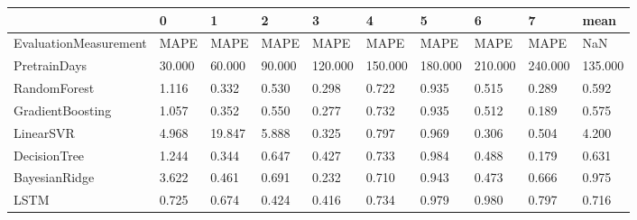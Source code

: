 \begin{tabular}{llllllllll}
\toprule
{} &      0 &      1 &      2 &       3 &       4 &       5 &       6 &       7 &    mean \\
\midrule
EvaluationMeasurement &   MAPE &   MAPE &   MAPE &    MAPE &    MAPE &    MAPE &    MAPE &    MAPE &     NaN \\
PretrainDays          & 30.000 & 60.000 & 90.000 & 120.000 & 150.000 & 180.000 & 210.000 & 240.000 & 135.000 \\
RandomForest          &  1.116 &  0.332 &  0.530 &   0.298 &   0.722 &   0.935 &   0.515 &   0.289 &   0.592 \\
GradientBoosting      &  1.057 &  0.352 &  0.550 &   0.277 &   0.732 &   0.935 &   0.512 &   0.189 &   0.575 \\
LinearSVR             &  4.968 & 19.847 &  5.888 &   0.325 &   0.797 &   0.969 &   0.306 &   0.504 &   4.200 \\
DecisionTree          &  1.244 &  0.344 &  0.647 &   0.427 &   0.733 &   0.984 &   0.488 &   0.179 &   0.631 \\
BayesianRidge         &  3.622 &  0.461 &  0.691 &   0.232 &   0.710 &   0.943 &   0.473 &   0.666 &   0.975 \\
LSTM                  &  0.725 &  0.674 &  0.424 &   0.416 &   0.734 &   0.979 &   0.980 &   0.797 &   0.716 \\
\bottomrule
\end{tabular}
